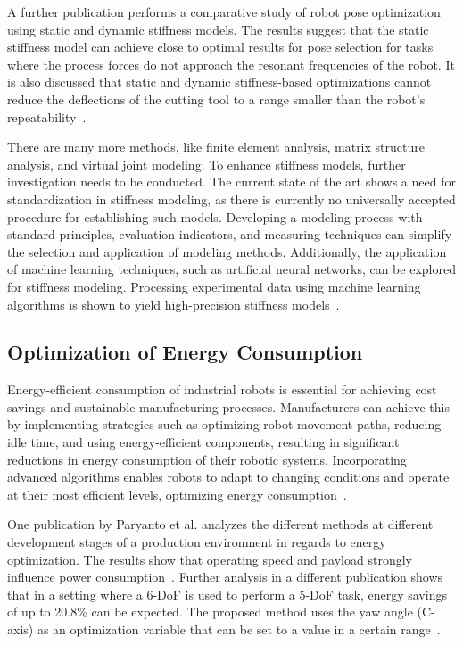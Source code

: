 A further publication performs a comparative study of robot pose optimization using static and dynamic stiffness models. The results suggest that the static stiffness model can achieve close to optimal results for pose selection for tasks where the process forces do not approach the resonant frequencies of the robot. It is also discussed that static and dynamic stiffness-based optimizations cannot reduce the deflections of the cutting tool to a range smaller than the robot's repeatability~\cite{Cvitanic.2020}.

There are many more methods, like finite element analysis, matrix structure analysis, and virtual joint modeling. 
To enhance stiffness models, further investigation needs to be conducted. The current state of the art shows a need for standardization in stiffness modeling, as there is currently no universally accepted procedure for establishing such models. Developing a modeling process with standard principles, evaluation indicators, and measuring techniques can simplify the selection and application of modeling methods. Additionally, the application of machine learning techniques, such as artificial neural networks, can be explored for stiffness modeling. Processing experimental data using machine learning algorithms is shown to yield high-precision stiffness models~\cite{Wu.2022}.

\subsection{Optimization of Energy Consumption}
Energy-efficient consumption of industrial robots is essential for achieving cost savings and sustainable manufacturing processes. Manufacturers can achieve this by implementing strategies such as optimizing robot movement paths, reducing idle time, and using energy-efficient components, resulting in significant reductions in energy consumption of their robotic systems. Incorporating advanced algorithms enables robots to adapt to changing conditions and operate at their most efficient levels, optimizing energy consumption~\cite{Uhlmann.2016}. 

One publication by  Paryanto et al. analyzes the different methods at different development stages of a production environment in regards to energy optimization. The results show that operating speed and payload strongly influence power consumption~\cite{Paryanto.2015}. Further analysis in a different publication shows that in a setting where a 6-\acrshort{DoF} is used to perform a 5-\acrshort{DoF} task, energy savings of up to 20.8\% can be expected. The proposed method uses the yaw angle (C-axis) as an optimization variable that can be set to a value in a certain range~\cite{Boscariol.2020}. 

